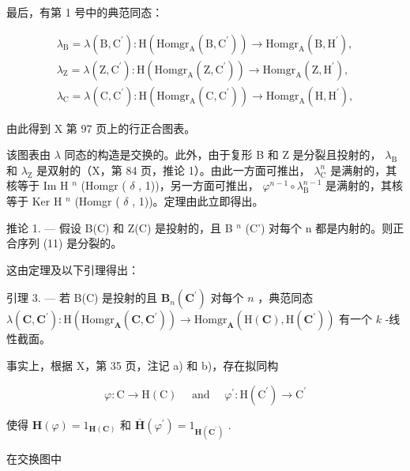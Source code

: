 最后，有第 1 号中的典范同态：

\[
\begin{array}{l} \lambda_ {\mathrm{B}} = \lambda (\mathrm{B}, \mathrm{C} ^ {\prime}): \mathrm{H} (\mathrm{Homgr} _ {\mathrm{A}} (\mathrm{B}, \mathrm{C} ^ {\prime})) \to \mathrm{Homgr} _ {\mathrm{A}} (\mathrm{B}, \mathrm{H} ^ {\prime}), \\ \lambda_ {\mathrm{Z}} = \lambda (\mathrm{Z}, \mathrm{C} ^ {\prime}): \mathrm{H} (\mathrm{Homgr} _ {\mathrm{A}} (\mathrm{Z}, \mathrm{C} ^ {\prime})) \to \mathrm{Homgr} _ {\mathrm{A}} (\mathrm{Z}, \mathrm{H} ^ {\prime}), \\ \lambda_ {\mathrm{C}} = \lambda (\mathrm{C}, \mathrm{C} ^ {\prime}): \mathrm{H} (\mathrm{Homgr} _ {\mathrm{A}} (\mathrm{C}, \mathrm{C} ^ {\prime})) \to \mathrm{Homgr} _ {\mathrm{A}} (\mathrm{H}, \mathrm{H} ^ {\prime}), \end{array}
\]

由此得到 X 第 97 页上的行正合图表。

该图表由 \(\lambda\) 同态的构造是交换的。此外，由于复形 B 和 Z 是分裂且投射的， \(\lambda_{\mathrm{B}}\) 和 \(\lambda_{\mathrm{Z}}\) 是双射的（X，第 84 页，推论 1）。由此一方面可推出， \(\lambda_{\mathrm{C}}^{n}\) 是满射的，其核等于 Im H \(^{n}\) (Homgr ( \(\delta\) , 1))，另一方面可推出， \(\varphi^{n-1} \circ \lambda_{\mathrm{B}}^{n-1}\) 是满射的，其核等于 Ker H \(^{n}\) (Homgr ( \(\delta\) , 1))。定理由此立即得出。

推论 1. --- 假设 B(C) 和 Z(C) 是投射的，且 B \(^{n}\) (C') 对每个 n 都是内射的。则正合序列 (11) 是分裂的。

这由定理及以下引理得出：

引理 3. --- 若 B(C) 是投射的且 \(\mathbf{B}_{n}(\mathbf{C}^{\prime})\) 对每个 \(n\) ，典范同态 \(\lambda(\mathbf{C}, \mathbf{C}^{\prime}): \mathrm{H}(\mathrm{Homgr}_{\mathbf{A}}(\mathbf{C}, \mathbf{C}^{\prime})) \to \mathrm{Homgr}_{\mathbf{A}}(\mathrm{H}(\mathbf{C}), \mathrm{H}(\mathbf{C}^{\prime}))\) 有一个 \(k\) -线性截面。

事实上，根据 X，第 35 页，注记 a) 和 b)，存在拟同构

\[
\varphi : \mathrm{C} \rightarrow \mathrm{H} (\mathrm{C}) \quad \text { and } \quad \varphi^ {\prime}: \mathrm{H} (\mathrm{C} ^ {\prime}) \rightarrow \mathrm{C} ^ {\prime}
\]

使得 \(\mathbf{H}(\varphi) = 1_{\mathbf{H}(\mathbf{C})}\) 和 \(\bar{\mathbf{H}} (\varphi^{\prime}) = 1_{\mathbf{H}(\mathbf{C}^{\prime})}\) .

在交换图中

